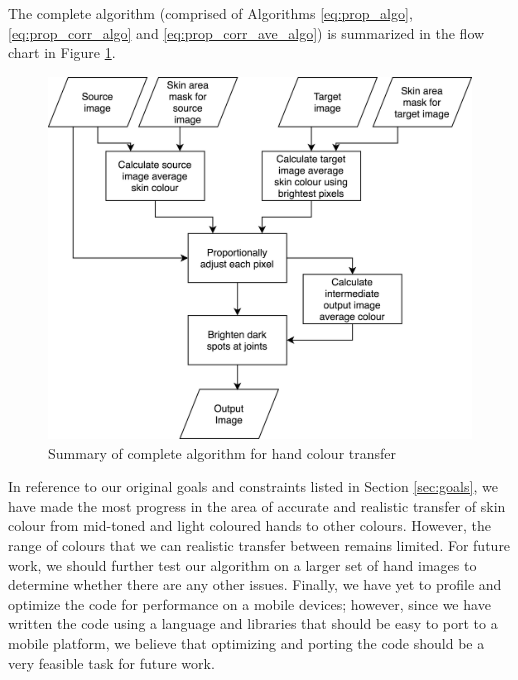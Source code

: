 The complete algorithm (comprised of Algorithms \ref{eq:prop_algo}, \ref{eq:prop_corr_algo} and \ref{eq:prop_corr_ave_algo}) is summarized in the flow chart in Figure \ref{img:algo_summary}.

\begin{figure}[H]
    \centering
    \includegraphics[width=\textwidth]{images/algo_diagram}
    \caption{Summary of complete algorithm for hand colour transfer}\label{img:algo_summary}
\end{figure}

In reference to our original goals and constraints listed in Section \ref{sec:goals}, we have made the most progress in the area of accurate and realistic transfer of skin colour from mid-toned and light coloured hands to other colours. However, the range of colours that we can realistic transfer between remains limited. For future work, we should further test our algorithm on a larger set of hand images to determine whether there are any other issues. Finally, we have yet to profile and optimize the code for performance on a mobile devices; however, since we have written the code using a language and libraries that should be easy to port to a mobile platform, we believe that optimizing and porting the code should be a very feasible task for future work.